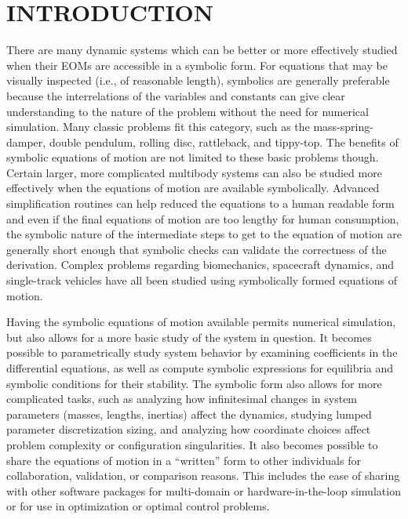\documentclass[twocolumn,10pt]{asme2e}
\begin{document}
\section*{INTRODUCTION}
There are many dynamic systems which can be better or more effectively studied
when their EOMs are accessible in a symbolic form. For
equations that may be visually inspected (i.e., of reasonable length),
symbolics are generally preferable because the interrelations of the variables
and constants can give clear understanding to the nature of the problem without
the need for numerical simulation. Many classic problems fit this category,
such as the mass-spring-damper, double pendulum, rolling disc, rattleback, and
tippy-top. The benefits of symbolic equations of motion are not limited to
these basic problems though. Certain larger, more complicated multibody systems
can also be studied more effectively when the equations of motion are available
symbolically. Advanced simplification routines can help reduced the equations
to a human readable form and even if the final equations of motion are too
lengthy for human consumption, the symbolic nature of the intermediate steps to
get to the equation of motion are generally short enough that symbolic checks
can validate the correctness of the derivation. Complex problems regarding
biomechanics, spacecraft dynamics, and single-track vehicles have all been
studied using symbolically formed equations of motion.

Having the symbolic equations of motion available permits numerical simulation,
but also allows for a more basic study of the system in question. It becomes
possible to parametrically study system behavior by examining coefficients in
the differential equations, as well as compute symbolic expressions for
equilibria and symbolic conditions for their stability. The symbolic form also
allows for more complicated tasks, such as analyzing how infinitesimal changes
in system parameters (masses, lengths, inertias) affect the dynamics, studying
lumped parameter discretization sizing, and analyzing how coordinate choices
affect problem complexity or configuration singularities. It also becomes
possible to share the equations of motion in a ``written'' form to other
individuals for collaboration, validation, or comparison reasons. This includes
the ease of sharing with other software packages for multi-domain or
hardware-in-the-loop simulation or for use in optimization or optimal control
problems.
\end{document}
